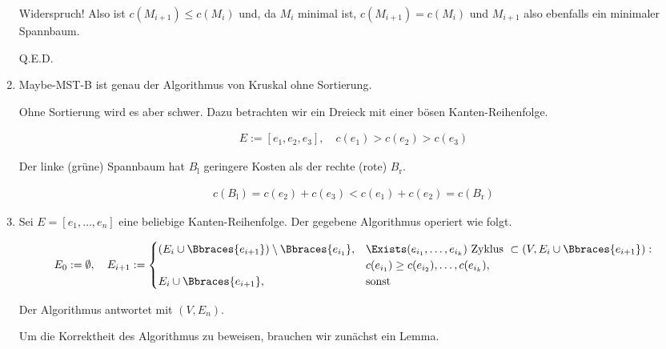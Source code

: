 \begin{solution}
\begin{enumerate}[label = (\Alph*)]
    Widerspruch!
    Also ist $c(M_{i+1}) \leq c(M_i)$ und, da $M_i$ minimal ist, $c(M_{i+1}) = c(M_i)$ und $M_{i+1}$ also ebenfalls ein minimaler Spannbaum.

    Q.E.D.

    \item Maybe-MST-B ist genau der Algorithmus von Kruskal ohne Sortierung.


    Ohne Sortierung wird es aber schwer.
    Dazu betrachten wir ein Dreieck mit einer bösen Kanten-Reihenfolge.

    \begin{align*}
        E := [e_1, e_2, e_3],
        \quad
        c(e_1) > c(e_2) > c(e_3)
    \end{align*}

    \begin{center}
        
    \end{center}

    Der linke (grüne) Spannbaum hat $B_\mathrm{l}$ geringere Kosten als der rechte (rote) $B_\mathrm{r}$.

    \begin{align*}
        c(B_\mathrm{l})
        =
        c(e_2) + c(e_3)
        <
        c(e_1) + c(e_2)
        =
        c(B_\mathrm{r})
    \end{align*}

    \item Sei $E = [e_1, \dots, e_n]$ eine beliebige Kanten-Reihenfolge.
    Der gegebene Algorithmus operiert wie folgt.

    \begin{align*}
        E_0 := \emptyset,
        \quad
        E_{i+1}
        :=
        \begin{cases}
            (E_i \cup \Bbraces{e_{i+1}}) \setminus \Bbraces{e_{i_1}},
            &
            \Exists (e_{i_1}, \dots, e_{i_k}) ~\text{Zyklus}~ \subset (V, E_i \cup \Bbraces{e_{i+1}}): \\
            &
            c(e_{i_1}) \geq c(e_{i_2}), \dots, c(e_{i_k}), \\
            E_i \cup \Bbraces{e_{i+1}}, & \text{sonst}
        \end{cases}
    \end{align*}

    Der Algorithmus antwortet mit $(V, E_n)$.

    Um die Korrektheit des Algorithmus zu beweisen, brauchen wir zunächst ein Lemma.


\end{enumerate}
\end{solution}
